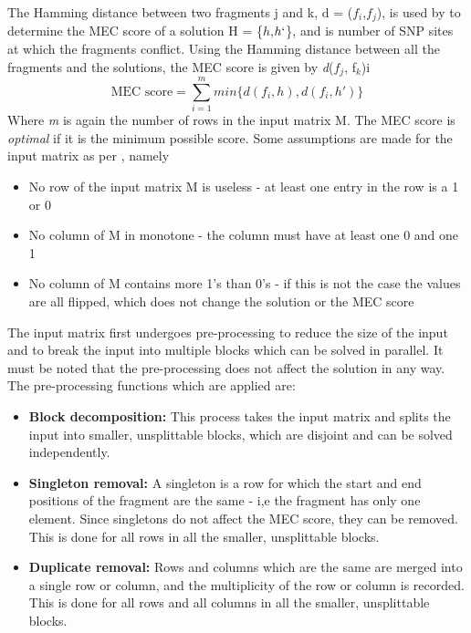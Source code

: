\documentclass[10pt,a4paer,twocolumn]{article}
\newcommand{\M}{\textit{m }}
\newcommand{\D}{\textit{d}}
\begin{document}
The Hamming distance between two fragments j and k, d = ($f_i$,$f_j$), is used by \cite{chen:2013} to 
determine the MEC score of a solution H = \{$h$,$h`$\}, and is number of SNP sites at which the fragments 
conflict. Using the Hamming distance between all the fragments and the solutions, the MEC score is given by
\D($f_j$, f$_k$)i
\begin{equation}
\textrm{MEC score} = \sum_{i = 1}^{m}{ min\{\D(f_i, h), \D(f_i, h')\} }
\end{equation}
Where \M is again the number of rows in the input matrix M. The MEC score is \textit{optimal} if it is the
minimum possible score. Some assumptions are made for the input matrix as per \cite{chen:2013}, namely
\begin{itemize}[noitemsep]
\item{ No row of the input matrix M is useless - at least one entry in the row is a 1 or 0 
}
\item{ No column of M in monotone - the column must have at least one 0 and one 1
}
\item{ No column of M contains more 1's than 0's - if this is not the case the values are all flipped, which
    does not change the solution or the MEC score
}
\end{itemize}
The input matrix first undergoes pre-processing to reduce the size of the input and to break the input into
multiple blocks which can be solved in parallel. It must be noted that the pre-processing does not affect 
the solution in any way. The pre-processing functions which are applied are:
\begin{itemize}[noitemsep]
\item{ \textbf{Block decomposition:} This process takes the input matrix and splits the input into smaller,
        unsplittable blocks, which are disjoint and can be solved independently.
}
\item{ \textbf{Singleton removal:} A singleton is a row for which the start and end positions of the fragment
    are the same - i,e the fragment has only one element. Since singletons do not affect the MEC score,
    they can be removed. This is done for all rows in all the smaller, unsplittable blocks.
}
\item{ \textbf{Duplicate removal:} Rows and columns which are the same are merged into a single row or column, 
        and the multiplicity of the row or column is recorded. This is done for all rows and all columns in
        all the smaller, unsplittable blocks.
}
\end{itemize}
\end{document}

